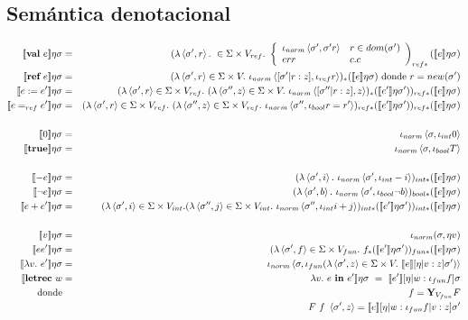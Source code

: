   \subsection{Semántica denotacional}
    \begin{eqnarray*}
      \se{\textbf{val}\ e}\eta\s &=& (\lambda \la\s',r\ra.\ \in \Sigma \times V_{ref}.
        \ \left\lbrace 
        \begin{array}{lll}
          \iota_{norm} \la\s',\s' r\ra & r\in dom(\s') \\
          err & c.c
        \end{array}\right)_{ref*} (\se{e}\eta\s) \\
      \se{\textbf{ref} \ e}\eta\s &=& (\lambda \la\s',r\ra \in \Sigma \times V.\ \iota_{norm}\la[\s'|r:z],\iota_{ref}r\ra)_* (\se{e}\eta\s) \text{ donde } r = new(\sigma')\\
      \se{e:=e'}\eta\s &=& (\lambda \la\s',r\ra \in \Sigma \times V_{ref}.\ (\lambda \la\s'',z\ra \in \Sigma \times V.\ \iota_{norm} \la[\s''|r:z],z\ra)_* (\se{e'}\eta\s') )_{ref*} (\se{e}\eta\s) \\
      \se{e=_{ref}e'}\eta\s &=& (\lambda \la\s',r\ra \in \Sigma \times V_{ref}.\ (\lambda \la\s'',z\ra \in \Sigma \times V_{ref}.\ \iota_{norm} \la\s'',\iota_{bool}r=r'\ra)_{ref*} (\se{e'}\eta\s') )_{ref*}(\se{e}\eta\s) \\ \\
      \se{0}\eta\s &=& \iota_{norm}\la \s,\iota_{int}0\ra \\
      \se{\textbf{true}}\eta\s &=& \iota_{norm}\la \s,\iota_{bool}T\ra \\ \\
      \se{-e}\eta\s &=& (\lambda \la \s',i\ra.\ \iota_{norm}\la \s',\iota_{int}-i\ra)_{int*}(\se{e}\eta\s) \\
      \se{\neg e}\eta\s &=& (\lambda \la \s',b\ra.\ \iota_{norm}\la \s',\iota_{bool}\neg b\ra)_{bool*}(\se{e}\eta\s) \\
      \se{e+e'}\eta\s &=& (\lambda \la \s',i\ra \in \Sigma \times V_{int}.(\lambda \la \s'',j\ra \in \Sigma \times V_{int}.\  \iota_{norm}\la \s'',\iota_{int}i+j\ra)_{int*}(\se{e'}\eta\s'))_{int*}(\se{e}\eta\s) \\ \\
      \se{v}\eta\s &=& \iota_{norm}(\s, \eta v) \\
      \se{ee'}\eta\s &=& (\lambda \la \s',f\ra \in \Sigma \times V_{fun}.\ f_* (\se{e'}\eta\s'))_{fun*}(\se{e}\eta\s) \\
      \se{\lambda v.\  e'}\eta\s &=&  \iota_{norm}\la \s, \iota_{fun}(\lambda \la\s',z\ra \in \Sigma \times V.\ \se{e}[\eta|v:z]\s')\ra \\
      \se{\textbf{letrec}\ w &=& \lambda v.\  e\ine e'}\eta\s \ = \ \se{e'}[\eta|w:\iota_{fun}f]\s \\
      \text{donde} && f = \textbf{Y}_{V_{fun}}F \\
      && F\ f \ \la\s',z\ra = \se{e}[\eta|w:\iota_{fun} f|v:z]\s'
    \end{eqnarray*}

